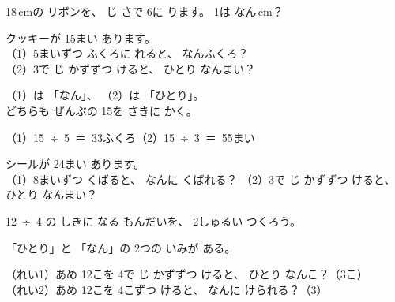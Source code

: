 \begin{jibun}
18\,cmの リボンを、 じ さで 6に ります。 1は なん\,cm？
\bkshikiran
{}
\end{jibun}


\begin{reidai}
クッキーが 15まい あります。\\
（1）5まいずつ ふくろに れると、 なんふくろ？\\
（2）3で じ かずずつ けると、 ひとり なんまい？

\kangaekata （1）は 「なん」、 （2）は 「ひとり」。\\
\bkqmkindent どちらも ぜんぶの 15を さきに かく。

\kotae （1）\mbox{15 ÷ 5 ＝ 3}\quad 3ふくろ\hspace{1.5\zw}（2）\mbox{15 ÷ 3 ＝ 5}\quad 5まい
\end{reidai}

\begin{jibun}
シールが 24まい あります。\\
（1）8まいずつ くばると、 なんに くばれる？
\bkshikiran
（2）3で じ かずずつ けると、 ひとり なんまい？
\bkshikiran
{}
\end{jibun}


\begin{reidai}
\mbox{12 ÷ 4} の しきに なる もんだいを、 2しゅるい つくろう。

\kangaekata 「ひとり」と 「なん」の 2つの いみが ある。

\kotae （れい1）あめ 12こを 4で じ かずずつ けると、 ひとり なんこ？（3こ）\\
（れい2）あめ 12こを 4こずつ けると、 なんに けられる？（3）
\end{reidai}

